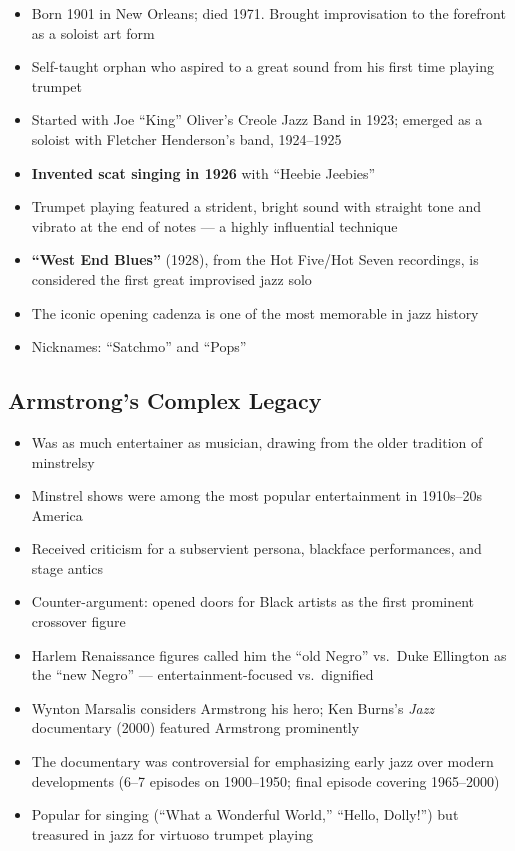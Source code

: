 \documentclass[11pt, letterpaper]{article}
\begin{document}
\begin{itemize}
    \item Born 1901 in New Orleans; died 1971. Brought improvisation to the forefront as a soloist art form
    \item Self-taught orphan who aspired to a great sound from his first time playing trumpet
    \item Started with Joe ``King'' Oliver's Creole Jazz Band in 1923; emerged as a soloist with Fletcher Henderson's band, 1924--1925
    \item \textbf{Invented scat singing in 1926} with ``Heebie Jeebies''
    \item Trumpet playing featured a strident, bright sound with straight tone and vibrato at the end of notes --- a highly influential technique
    \item \textbf{``West End Blues''} (1928), from the Hot Five/Hot Seven recordings, is considered the first great improvised jazz solo
    \item The iconic opening cadenza is one of the most memorable in jazz history
    \item Nicknames: ``Satchmo'' and ``Pops''
\end{itemize}

\subsection{Armstrong's Complex Legacy}
\begin{itemize}
    \item Was as much entertainer as musician, drawing from the older tradition of minstrelsy
    \item Minstrel shows were among the most popular entertainment in 1910s--20s America
    \item Received criticism for a subservient persona, blackface performances, and stage antics
    \item Counter-argument: opened doors for Black artists as the first prominent crossover figure
    \item Harlem Renaissance figures called him the ``old Negro'' vs.\ Duke Ellington as the ``new Negro'' --- entertainment-focused vs.\ dignified
    \item Wynton Marsalis considers Armstrong his hero; Ken Burns's \textit{Jazz} documentary (2000) featured Armstrong prominently
    \item The documentary was controversial for emphasizing early jazz over modern developments (6--7 episodes on 1900--1950; final episode covering 1965--2000)
    \item Popular for singing (``What a Wonderful World,'' ``Hello, Dolly!'') but treasured in jazz for virtuoso trumpet playing
\end{itemize}
\end{document}

